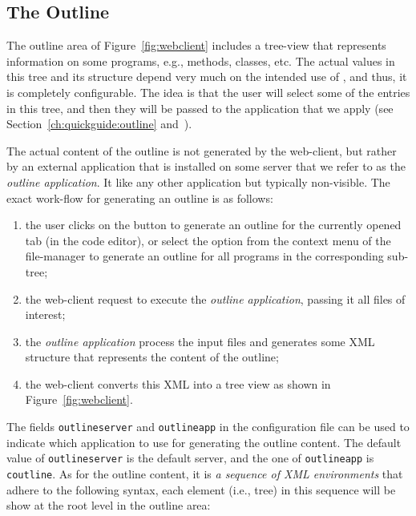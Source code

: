 \subsection{The Outline}
\label{ch:clients:web:outline}

The outline area of Figure~\ref{fig:webclient} includes a tree-view
that represents information on some programs, e.g., methods, classes,
etc. The actual values in this tree and its structure depend very much
on the intended use of \ei, and thus, it is completely configurable.
%
The idea is that the user will select some of the entries in this
tree, and then they will be passed to the application that we apply
(see Section~\ref{ch:quickguide:outline}
and~).

The actual content of the outline is not generated by the web-client,
but rather by an external application that is installed on some \ei
server that we refer to as the \emph{outline application}. It like any
other application but typically non-visible.  The exact work-flow for
generating an outline is as follows:
%
\begin{enumerate}

\item the user clicks on the  button to generate an
  outline for the currently opened tab (in the code editor), or select
  the  option from the context menu of the file-manager
  to generate an outline for all programs in the corresponding
  sub-tree;

\item the web-client request to execute the \emph{outline
    application}, passing it all files of interest;

\item the \emph{outline application} process the input files and
  generates some XML structure that represents the content of the
  outline;

\item the web-client converts this XML into a tree view as shown in
  Figure~\ref{fig:webclient}.

\end{enumerate}
%
The fields \texttt{outlineserver} and \texttt{outlineapp} in the
configuration file can be used to indicate which application to use
for generating the outline content. The default value of
\texttt{outlineserver} is the default server, and the one of
\texttt{outlineapp} is \texttt{coutline}. As for the outline content,
it is \emph{a sequence of XML environments} that adhere to the
following syntax, each element (i.e., tree) in this sequence will be
show at the root level in the outline area:

